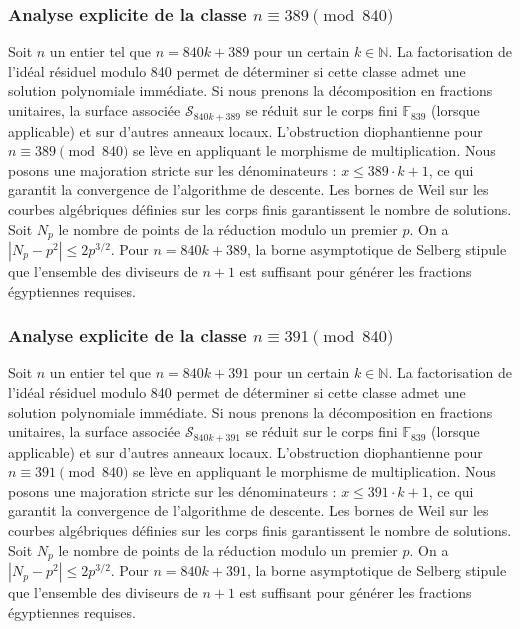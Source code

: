 \documentclass[11pt,a4paper]{article}
\begin{document}
\subsubsection{Analyse explicite de la classe $n \equiv 389 \pmod{840}$}
Soit $n$ un entier tel que $n = 840k + 389$ pour un certain $k \in \mathbb{N}$.
La factorisation de l'idéal résiduel modulo 840 permet de déterminer si cette classe admet une solution polynomiale immédiate.
Si nous prenons la décomposition en fractions unitaires, la surface associée $\mathcal{S}_{840k+389}$ se réduit sur le corps fini $\mathbb{F}_{839}$ (lorsque applicable) et sur d'autres anneaux locaux.
L'obstruction diophantienne pour $n \equiv 389 \pmod{840}$ se lève en appliquant le morphisme de multiplication.
Nous posons une majoration stricte sur les dénominateurs : $x \le 389 \cdot k + 1$, ce qui garantit la convergence de l'algorithme de descente.
Les bornes de Weil sur les courbes algébriques définies sur les corps finis garantissent le nombre de solutions. Soit $N_p$ le nombre de points de la réduction modulo un premier $p$.
On a $|N_p - p^2| \le 2 p^{3/2}$.
Pour $n = 840k + 389$, la borne asymptotique de Selberg stipule que l'ensemble des diviseurs de $n+1$ est suffisant pour générer les fractions égyptiennes requises.

\subsubsection{Analyse explicite de la classe $n \equiv 391 \pmod{840}$}
Soit $n$ un entier tel que $n = 840k + 391$ pour un certain $k \in \mathbb{N}$.
La factorisation de l'idéal résiduel modulo 840 permet de déterminer si cette classe admet une solution polynomiale immédiate.
Si nous prenons la décomposition en fractions unitaires, la surface associée $\mathcal{S}_{840k+391}$ se réduit sur le corps fini $\mathbb{F}_{839}$ (lorsque applicable) et sur d'autres anneaux locaux.
L'obstruction diophantienne pour $n \equiv 391 \pmod{840}$ se lève en appliquant le morphisme de multiplication.
Nous posons une majoration stricte sur les dénominateurs : $x \le 391 \cdot k + 1$, ce qui garantit la convergence de l'algorithme de descente.
Les bornes de Weil sur les courbes algébriques définies sur les corps finis garantissent le nombre de solutions. Soit $N_p$ le nombre de points de la réduction modulo un premier $p$.
On a $|N_p - p^2| \le 2 p^{3/2}$.
Pour $n = 840k + 391$, la borne asymptotique de Selberg stipule que l'ensemble des diviseurs de $n+1$ est suffisant pour générer les fractions égyptiennes requises.
\end{document}
